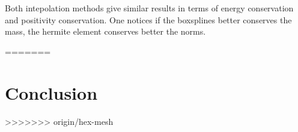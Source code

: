 \documentclass[proc]{edpsmath}
\begin{document}
Both intepolation methods give similar results in terms of energy conservation and positivity conservation. One notices if the boxsplines better conserves the mass, the hermite element conserves better the norms.  

=======

\section{Conclusion}
\label{sec:conclusion}
>>>>>>> origin/hex-mesh


\newpage


\end{document}
